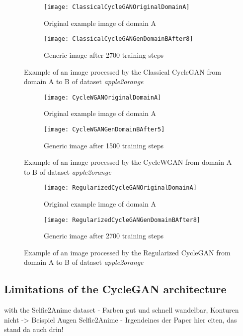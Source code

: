 \documentclass[fleqn,10pt]{SelfArx} %
\begin{document}
\begin{figure}[htb] 
	\centering 
\begin{subfigure}[b]{0.45\linewidth}
	\texttt{[image: ClassicalCycleGANOriginalDomainA]}
	\caption{Original example image of domain A}
\end{subfigure}
\hfill
\begin{subfigure}[b]{0.45\linewidth}
	\texttt{[image: ClassicalCycleGANGenDomainBAfter8]}
	\caption{Generic image after 2700 training steps}
	\end{subfigure}
\caption{Example of an image processed by the Classical Cycle\ac{GAN} from domain A to B of dataset \textit{apple2orange}}
\label{fig:ClassicalCycleGANExample}
\end{figure}

\begin{figure}[htb] 
	\centering 
\begin{subfigure}[b]{0.45\linewidth}
	\texttt{[image: CycleWGANOriginalDomainA]}
	\caption{Original example image of domain A}
\end{subfigure}
\hfill
\begin{subfigure}[b]{0.45\linewidth}
	\texttt{[image: CycleWGANGenDomainBAfter5]}
	\caption{Generic image after 1500 training steps}
	\end{subfigure}
\caption{Example of an image processed by the Cycle\ac{WGAN} from domain A to B of dataset \textit{apple2orange}}
\label{fig:CycleWGANExample}
\end{figure}

\begin{figure}[htb] 
	\centering 
\begin{subfigure}[b]{0.45\linewidth}
	\texttt{[image: RegularizedCycleGANOriginalDomainA]}
	\caption{Original example image of domain A}
\end{subfigure}
\hfill
\begin{subfigure}[b]{0.45\linewidth}
	\texttt{[image: RegularizedCycleGANGenDomainBAfter8]}
	\caption{Generic image after 2700 training steps}
	\end{subfigure}
\caption{Example of an image processed by the Regularized Cycle\ac{GAN} from domain A to B of dataset \textit{apple2orange}}
\label{fig:RegularizedCycleGANExample}
\end{figure}

\subsection{Limitations of the Cycle\ac{GAN} architecture}
with the Selfie2Anime dataset - Farben gut und schnell wandelbar, Konturen nicht -> Beispiel Augen Selfie2Anime - Irgendeines der Paper hier citen, das stand da auch drin!
\end{document}
